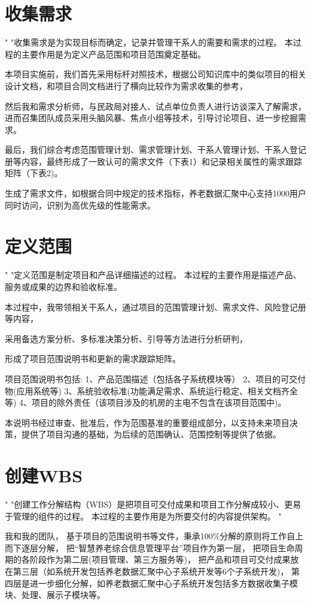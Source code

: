 \documentclass[UTF8]{../computerUniverse}
\begin{document}
\section{收集需求}
"
"收集需求是为实现目标而确定，记录并管理干系人的需要和需求的过程。
本过程的主要作用是为定义产品范围和项目范围奠定基础。

本项目实施前，我们首先采用标杆对照技术，根据公司知识库中的类似项目的相关设计文档，和项目合同文档进行了横向比较作为需求收集的参考，

然后我和需求分析师，与民政局对接人、试点单位负责人进行访谈深入了解需求，
进而召集团队成员采用头脑风暴、焦点小组等技术，引导讨论项目、进一步挖掘需求。

最后，我们综合考虑范围管理计划、需求管理计划、干系人管理计划、干系人登记册等内容，最终形成了一致认可的需求文件（下表1）和记录相关属性的需求跟踪矩阵（下表2)。

生成了需求文件，如根据合同中规定的技术指标，养老数据汇聚中心支持1000用户同时访问，识别为高优先级的性能需求。




\section{定义范围}
"
"定义范围是制定项目和产品详细描述的过程。
本过程的主要作用是描述产品、服务或成果的边界和验收标准。


本过程中，我带领相关干系人，通过项目的范围管理计划、需求文件、风险登记册等内容，

采用备选方案分析、多标准决策分析、引导等方法进行分析研判，

形成了项目范围说明书和更新的需求跟踪矩阵。

项目范围说明书包括:
1、产品范围描述（包括各子系统模块等）
2、项目的可交付物(应用系统等)
3、系统验收标准(功能满足需求、系统运行稳定、相关文档齐全等)
4、项目的除外责任（该项目涉及的机房的主电不包含在该项目范围中)。

本说明书经过审查、批准后，作为范围基准的重要组成部分，以支持未来项目决策，提供了项目沟通的基础，为后续的范围确认、范围控制等提供了依据。



\section{创建WBS}
"
"创建工作分解结构（WBS）是把项目可交付成果和项目工作分解成较小、更易于管理的组件的过程。
本过程的主要作用是为所要交付的内容提供架构。
"

我和我的团队，
基于项目的范围说明书等文件，秉承100\%分解的原则将工作自上而下逐层分解，
把“智慧养老综合信息管理平台”项目作为第一层，
把项目生命周期的各阶段作为第二层(项目管理、第三方服务等)，
把产品和项目可交付成果放在第三层（如系统开发包括养老数据汇聚中心子系统开发等6个子系统开发)，
第四层是进一步细化分解，如养老数据汇聚中心子系统开发包括多方数据收集子模块、处理、展示子模块等。
\end{document}

